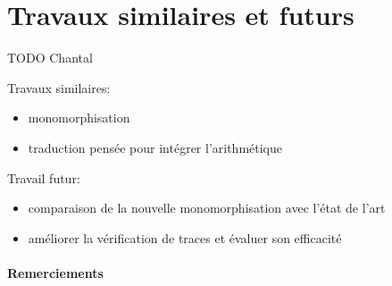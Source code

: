 \section{Travaux similaires et futurs}
\label{sec:similaires}

TODO Chantal

Travaux similaires:
\begin{itemize}
\item monomorphisation
\item traduction pensée pour intégrer l'arithmétique
\end{itemize}

Travail futur:
\begin{itemize}
\item comparaison de la nouvelle monomorphisation avec l'état de l'art
\item améliorer la vérification de traces et évaluer son efficacité
\end{itemize}

\paragraph{Remerciements}
